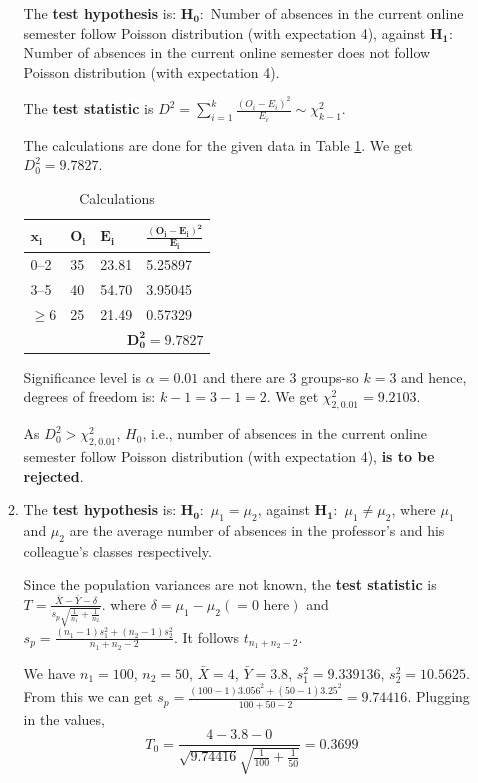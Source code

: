 \documentclass[12pt, oneside]{article}
\begin{document}
\begin{enumerate}
\begin{enumerate}
The {\bf test hypothesis} is:  $\mathbf{H_0 :}$ Number of absences in the current online semester follow Poisson distribution (with expectation 4), against 
$\mathbf{H_1 :}$ Number of absences in the current online semester does not follow Poisson distribution (with expectation 4).

The {\bf test statistic} is $D^2 = \sum_{i=1}^{k} \frac{(O_i - E_i)^2}{E_i} \sim \chi^2_{k-1}$.

The calculations are done for the given data in Table \ref{tab:q1_calc_1}. We get $D_0^2 = 9.7827$.


\begin{table}[h]
    \centering
    \begin{tabular}{l|l|l|l}
        \hline
         $\mathbf{x_i}$ & $\mathbf{O_i}$ & $\mathbf{E_i}$ & $\mathbf{\frac{(O_i - E_i)^2}{E_i} }$ \\
         \hline
            0–2	& 35 & 23.81 & 5.25897  \\
            3–5 & 40 & 54.70 & 3.95045\\
          $\ge$6& 25 & 21.49 & 0.57329 \\ 
        \hline
        \multicolumn{4}{r}{ $\mathbf{D_0^2 = 9.7827}$ }\\
        \hline
    \end{tabular}
    \caption{Calculations}
    \label{tab:q1_calc_1}
\end{table}

Significance level is $\alpha = 0.01$ and there are 3 groups-so $k = 3$ and hence, degrees of freedom is: $k -1 = 3-1 = 2$. We get $\chi^2_{2,0.01} = 9.2103$.

As $D_0^2 > \chi^2_{2,0.01}$, $H_0$, i.e., number of absences in the current online semester follow Poisson distribution (with expectation 4), \textbf{is to be rejected}.

\item
The {\bf test hypothesis} is:  $\mathbf{H_0 :}$ $\mu_1 = \mu_2$, against 
$\mathbf{H_1 :}$ $\mu_1 \ne \mu_2$, where $\mu_1$ and $\mu_2$ are the average number of absences in the professor's and his colleague's classes respectively.

Since the population variances are not known, the {\bf test statistic} is $T = \frac{\bar X - \bar Y - \delta}{s_{p}\sqrt{\frac{1}{n_1} + \frac{1}{n_2}}}$.
where $\delta = \mu_1 - \mu_2 (= 0 \text{ here})$ and $s_p = \frac{ (n_1-1)s_1^2 + (n_2-1)s_2^2 }{n_1 + n_2 - 2}$. It follows $t_{n_1+n_2-2}$. 

We have $n_1=100$, $n_2=50$, $\bar X = 4$, $\bar Y = 3.8$, $s_1^2=9.339136$, $s_2^2 = 10.5625$. From this we can get $s_p = \frac{(100-1) 3.056^{2}+(50-1)3.25^{2}}{100+50-2} = 9.74416$. Plugging in the values,
\[ T_0 = \frac{4-3.8-0}{\sqrt{9.74416}\sqrt{\frac{1}{100}+\frac{1}{50}}} = 0.3699 \]


\end{enumerate}
\end{enumerate}
\end{document}
